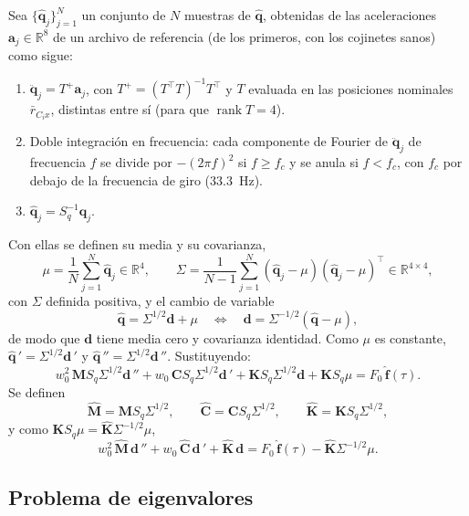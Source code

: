 Sea $\{\hat{\mathbf q}_j\}_{j=1}^N$ un conjunto de $N$ muestras de $\hat{\mathbf q}$, obtenidas de las aceleraciones
$\mathbf a_j\in\mathbb R^{8}$ de un archivo de referencia (de los primeros, con los cojinetes sanos) como sigue:
\begin{enumerate}
\item $\ddot{\mathbf q}_j=T^{+}\mathbf a_j$, con $T^{+}=(T^\top T)^{-1}T^\top$ y $T$ evaluada en las posiciones
nominales $\bar r_{C_ix}$, distintas entre sí (para que $\operatorname{rank}T=4$).
\item Doble integración en frecuencia: cada componente de Fourier de $\ddot{\mathbf q}_j$ de frecuencia $f$ se divide
por $-(2\pi f)^2$ si $f\ge f_c$ y se anula si $f<f_c$, con $f_c$ por debajo de la frecuencia de giro ($33.3$~Hz).
\item $\hat{\mathbf q}_j=S_q^{-1}\mathbf q_j$.
\end{enumerate}
Con ellas se definen su media y su covarianza,
\[
\mu=\frac1N\sum_{j=1}^N\hat{\mathbf q}_j\in\mathbb R^4,\qquad
\Sigma=\frac1{N-1}\sum_{j=1}^N(\hat{\mathbf q}_j-\mu)(\hat{\mathbf q}_j-\mu)^\top\in\mathbb R^{4\times4},
\]
con $\Sigma$ definida positiva, y el cambio de variable
\[
\hat{\mathbf q}=\Sigma^{1/2}\mathbf d+\mu\quad\Longleftrightarrow\quad \mathbf d=\Sigma^{-1/2}(\hat{\mathbf q}-\mu),
\]
de modo que $\mathbf d$ tiene media cero y covarianza identidad. Como $\mu$ es constante, 
$\hat{\mathbf q}\,'=\Sigma^{1/2}\mathbf d\,'$ y $\hat{\mathbf q}\,''=\Sigma^{1/2}\mathbf d\,''$. Sustituyendo:
\[
w_0^2\,\mathbf MS_q\Sigma^{1/2}\mathbf d\,''+w_0\,\mathbf CS_q\Sigma^{1/2}\mathbf d\,'+\mathbf KS_q\Sigma^{1/2}\mathbf d+\mathbf KS_q\mu=F_0\,\hat{\mathbf f}(\tau).
\]
Se definen
\[
\hat{\mathbf M}=\mathbf MS_q\Sigma^{1/2},\qquad
\hat{\mathbf C}=\mathbf CS_q\Sigma^{1/2},\qquad
\hat{\mathbf K}=\mathbf KS_q\Sigma^{1/2},
\]
y como $\mathbf KS_q\mu=\hat{\mathbf K}\Sigma^{-1/2}\mu$,
\begin{equation}\label{eq:escalada}
w_0^2\,\hat{\mathbf M}\,\mathbf d\,''+w_0\,\hat{\mathbf C}\,\mathbf d\,'+\hat{\mathbf K}\,\mathbf d=F_0\,\hat{\mathbf f}(\tau)-\hat{\mathbf K}\Sigma^{-1/2}\mu .
\end{equation}

\subsection{Problema de eigenvalores}

